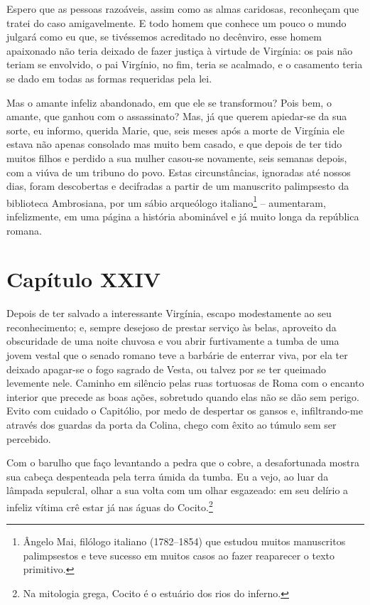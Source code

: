  Espero que as pessoas razoáveis, assim como as almas caridosas,
reconheçam que tratei do caso amigavelmente. E todo homem que conhece
um pouco o mundo julgará como eu que, se tivéssemos acreditado no
decênviro, esse homem apaixonado não teria deixado de fazer justiça à
virtude de Virgínia: os pais não teriam se envolvido, o pai Virgínio,
no fim, teria se acalmado, e o casamento teria se dado em todas as
formas requeridas pela lei.

 Mas o amante infeliz abandonado, em que ele se transformou? Pois bem, o
amante, que ganhou com o assassinato? Mas, já que querem apiedar-se da
sua sorte, eu informo, querida Marie, que, seis meses após a morte de
Virgínia ele estava não apenas consolado mas muito bem casado, e que
depois de ter tido muitos filhos e perdido a sua mulher casou-se
novamente, seis semanas depois, com a viúva de um tribuno do povo.
Estas circunstâncias, ignoradas até nossos dias, foram descobertas e
decifradas a partir de um manuscrito palimpsesto da biblioteca
Ambrosiana, por um sábio arqueólogo italiano\footnote{ Ângelo Mai,
filólogo italiano (1782--1854) que estudou muitos manuscritos
palimpsestos e teve sucesso em muitos casos ao fazer reaparecer o texto
primitivo.} -- aumentaram, infelizmente, em uma página a história
abominável e já muito longa da república romana. 

\section{Capítulo XXIV}

 Depois de ter salvado a interessante Virgínia, escapo modestamente ao
seu reconhecimento; e, sempre desejoso de prestar serviço às belas,
aproveito da obscuridade de uma noite chuvosa e vou abrir furtivamente
a tumba de uma jovem vestal que o senado romano teve a barbárie de
enterrar viva, por ela ter deixado apagar-se o fogo sagrado de Vesta,
ou talvez por se ter queimado levemente nele. Caminho em silêncio pelas
ruas tortuosas de Roma com o encanto interior que precede as boas
ações, sobretudo quando elas não se dão sem perigo. Evito com cuidado o
Capitólio, por medo de despertar os gansos e, infiltrando-me através
dos guardas da porta da Colina, chego com êxito ao túmulo sem ser
percebido.

 Com o barulho que faço levantando a pedra que o cobre, a desafortunada
mostra sua cabeça despenteada pela terra úmida da tumba. Eu a vejo, ao
luar da lâmpada sepulcral, olhar a sua volta com um olhar esgazeado: em
seu delírio a infeliz vítima crê estar já nas águas do Cocito.\footnote{ Na 
mitologia grega, Cocito é o estuário dos rios do inferno.}

